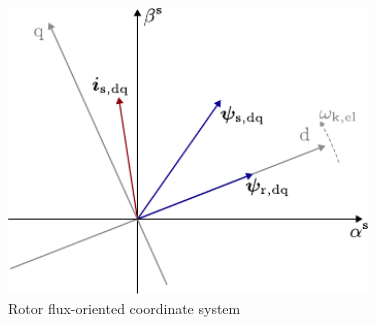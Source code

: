 \begin{frame}
\begin{columns}
\begin{column}{0.45\textwidth}
\begin{figure}
                \includegraphics[width=0.85\textwidth]{fig/lec06/K_coordinates_rotor_flux_orientation.pdf}
                \caption{Rotor flux-oriented coordinate system}
                \label{fig:K_coordinates_rotor_flux_orientation}
            \end{figure}
        \end{column}
    \end{columns}
\end{frame}


